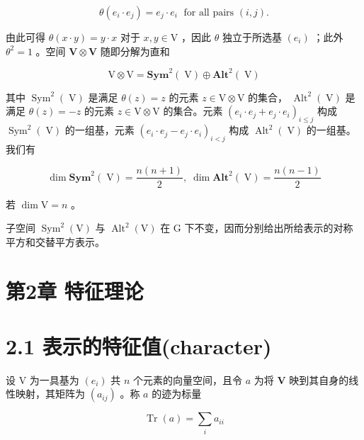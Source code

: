\documentclass[10pt]{article}
\begin{document}
\[
\theta \left( {{e}_{i} \cdot  {e}_{j}}\right)  = {e}_{j} \cdot  {e}_{i}\;\text{ for all pairs }\left( {i,j}\right) .
\]

由此可得 \(\theta \left( {x \cdot  y}\right)  = y \cdot  x\) 对于 \(x,y \in  \mathrm{V}\) ，因此 \(\theta\) 独立于所选基 \(\left( {e}_{i}\right)\) ；此外 \({\theta }^{2} = 1\) 。空间 \(\mathbf{V} \otimes  \mathbf{V}\) 随即分解为直和

\[
\mathrm{V} \otimes  \mathrm{V} = {\mathbf{{Sym}}}^{2}\left( \mathrm{\;V}\right)  \oplus  {\mathbf{{Alt}}}^{2}\left( \mathrm{\;V}\right)
\]

其中 \({\operatorname{Sym}}^{2}\left( \mathrm{\;V}\right)\) 是满足 \(\theta \left( z\right)  = z\) 的元素 \(z \in  \mathrm{V} \otimes  \mathrm{V}\) 的集合， \({\operatorname{Alt}}^{2}\left( \mathrm{\;V}\right)\) 是满足 \(\theta \left( z\right)  =  - z\) 的元素 \(z \in  \mathrm{V} \otimes  \mathrm{V}\) 的集合。元素 \({\left( {e}_{i} \cdot  {e}_{j} + {e}_{j} \cdot  {e}_{i}\right) }_{i \leq  j}\) 构成 \({\operatorname{Sym}}^{2}\left( \mathrm{\;V}\right)\) 的一组基，元素 \({\left( {e}_{i} \cdot  {e}_{j} - {e}_{j} \cdot  {e}_{i}\right) }_{i < j}\) 构成 \({\operatorname{Alt}}^{2}\left( \mathrm{\;V}\right)\) 的一组基。我们有

\[
\dim {\mathbf{{Sym}}}^{2}\left( \mathrm{\;V}\right)  = \frac{n\left( {n + 1}\right) }{2},\;\dim {\mathbf{{Alt}}}^{2}\left( \mathrm{\;V}\right)  = \frac{n\left( {n - 1}\right) }{2}
\]

若 \(\dim \mathrm{V} = n\) 。

子空间 \({\operatorname{Sym}}^{2}\left( \mathrm{V}\right)\) 与 \({\operatorname{Alt}}^{2}\left( \mathrm{V}\right)\) 在 \(\mathrm{G}\) 下不变，因而分别给出所给表示的对称平方和交替平方表示。

\section*{第2章 特征理论}

\section*{2.1 表示的特征值(character)}

设 \(\mathrm{V}\) 为一具基为 \(\left( {e}_{i}\right)\) 共 \(n\) 个元素的向量空间，且令 \(a\) 为将 \(\mathbf{V}\) 映到其自身的线性映射，其矩阵为 \(\left( {a}_{ij}\right)\) 。称 \(a\) 的迹为标量

\[
\operatorname{Tr}\left( a\right)  = \mathop{\sum }\limits_{i}{a}_{ii}
\]
\end{document}
